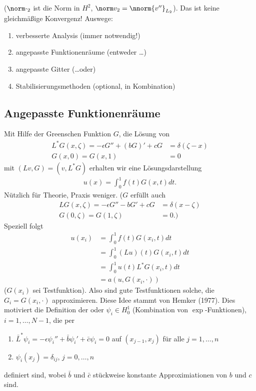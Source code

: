 ($\norm \cdot_{2}$ ist die Norm in $H^2$, $\norm v_{2} = \nnorm {v''}_{L_{2}}$). 
Das ist keine gleichmäßige Konvergenz! Auswege:
\begin{enumerate}
\item verbesserte Analysis (immer notwendig!)
\item angepasste Funktionenräume (entweder \dots)
\item angepasste Gitter (\dots oder)
\item Stabilisierungsmethoden (optional, in Kombination)
\end{enumerate}

\subsection{Angepasste Funktionenräume}
\label{sec:angep-funkt}

Mit Hilfe der Greenschen Funktion $G$, die Lösung von
\begin{align*}
  L^{*}G(x, \zeta) = - \epsilon G'' + (bG)' + cG &= \delta(\zeta-x)\\
  G(x, 0) = G(x, 1) &= 0
\end{align*}
mit $(Lv, G) = (v, L^{*}G)$ erhalten wir eine Lösungsdarstellung
\begin{align*}
  u(x) = \int_{0}^{1}f(t) G(x, t)dt. 
\end{align*}
Nützlich für Theorie, Praxis weniger. 
($G$ erfüllt auch
\begin{align*}
  LG(x, \zeta) = - \epsilon G'' - bG' + cG &= \delta(x - \zeta)\\
  G(0, \zeta) = G(1, \zeta) &= 0. )
\end{align*}
Speziell folgt
\begin{align*}
  u(x_{i}) &= \int_{0}^{1}f(t) G(x_{i}, t)dt\\
  &= \int_{0}^{1}(Lu)(t) G(x_{i}, t) dt\\
  &= \int_{0}^{1}u(t) L^{*}G(x_{i}, t) dt\\
  &= a (u, G(x_{i}, \cdot))
\end{align*}
($G(x_{i})$ sei Testfunktion). 
Also sind gute Testfunktionen solche, die $G_{i} = G(x_{i}, \cdot)$ approximieren. Diese Idee stammt von Hemker (1977).  Dies motiviert die Definition der  oder  $\psi_{i} \in H_{0}^{1}$ (Kombination von $\exp$-Funktionen), $i= 1, \dots, N-1$, die per
\begin{enumerate}
\item $\bar L^{*} \psi_{i} = - \epsilon \psi_{i}'' + \bar b \psi_{i}' + \bar c \psi_{i} = 0$
  auf $(x_{j-1}, x_{j})$ für alle $j = 1, \dots, n$
\item $\psi_{i}(x_{j}) = \delta_{ij}$, $j = 0, \dots, n$
\end{enumerate}
definiert sind, wobei $\bar b$ und $\bar c$ stückweise konstante Approximiationen von $b$ und $c$ sind. 

